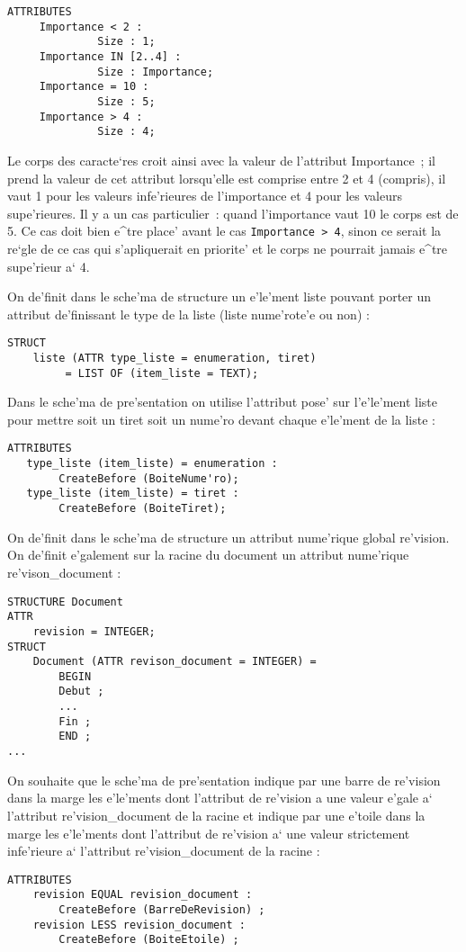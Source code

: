 {\begin{example}
\begin{verbatim}
ATTRIBUTES
     Importance < 2 :
              Size : 1;
     Importance IN [2..4] :
              Size : Importance;
     Importance = 10 :
              Size : 5;
     Importance > 4 :
              Size : 4;
\end{verbatim}
Le corps des caracte`res croit ainsi avec la valeur de l'attribut
Importance~; il prend la valeur de cet attribut lorsqu'elle est comprise
entre 2 et 4 (compris), il vaut 1 pour les valeurs infe'rieures de
l'importance et 4 pour les valeurs supe'rieures. Il y a un cas particulier~:
quand l'importance vaut 10 le corps est de 5. Ce cas doit bien e^tre place'
avant le cas {\tt Importance~>~4}, sinon ce serait la re`gle de ce cas qui
s'apliquerait en priorite' et le corps ne pourrait jamais e^tre supe'rieur a` 4.
\end{example}

\begin{example}
On de'finit dans le sche'ma de structure un e'le'ment liste pouvant
porter un attribut de'finissant le type de la liste (liste nume'rote'e
ou non) :
\begin{verbatim}
STRUCT
    liste (ATTR type_liste = enumeration, tiret)
         = LIST OF (item_liste = TEXT);
\end{verbatim}
Dans le sche'ma de pre'sentation on utilise l'attribut pose' sur
l'e'le'ment liste pour mettre soit un tiret soit un nume'ro devant
chaque e'le'ment de la liste :
\begin{verbatim}
ATTRIBUTES
   type_liste (item_liste) = enumeration :
        CreateBefore (BoiteNume'ro);
   type_liste (item_liste) = tiret :
        CreateBefore (BoiteTiret);
\end{verbatim}
\end{example}

\begin{example}
On de'finit dans le sche'ma de structure un attribut nume'rique global re'vision. On de'finit e'galement sur la racine du document un
attribut nume'rique re'vison\_document :
\begin{verbatim}
STRUCTURE Document
ATTR
    revision = INTEGER;
STRUCT
    Document (ATTR revison_document = INTEGER) =
        BEGIN
        Debut ;
        ...
        Fin ;
        END ;
...
\end{verbatim}
On souhaite que le sche'ma de pre'sentation indique par une barre de
re'vision dans la marge les e'le'ments dont l'attribut de re'vision a
une valeur e'gale a` l'attribut re'vision\_document de la racine et
indique par une e'toile dans la marge les e'le'ments dont l'attribut de
re'vision a` une valeur strictement infe'rieure a` l'attribut
re'vision\_document de la racine :
\begin{verbatim}
ATTRIBUTES
    revision EQUAL revision_document :
        CreateBefore (BarreDeRevision) ;
    revision LESS revision_document :
        CreateBefore (BoiteEtoile) ;
\end{verbatim}
\end{example}

}
